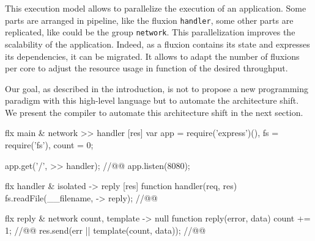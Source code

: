 This execution model allows to parallelize the execution of an application.
Some parts are arranged in pipeline, like the fluxion \texttt{handler}, some other parts are replicated, like could be the group \texttt{network}.
This parallelization improves the scalability of the application.
Indeed, as a fluxion contains its state and expresses its dependencies, it can be migrated.
It allows to adapt the number of fluxions per core to adjust the resource usage in function of the desired throughput.



Our goal, as described in the introduction, is not to propose a new programming paradigm with this high-level language but to automate the architecture shift.
We present the compiler to automate this architecture shift in the next section.

\begin{code}[flx, caption={Example application expressed in the high-level fluxional language},label={lst:fluxional}]
flx main & network
>> handler [res]
  var app = require('express')(),
      fs = require('fs'),
      count = 0;

  app.get('/', >> handler); //@\label{lst:fluxional-streamtohandler}@
  app.listen(8080);

flx handler & isolated
-> reply [res]
  function handler(req, res) {
    fs.readFile(__filename, -> reply); //@\label{lst:fluxional-readfile}@
  }

flx reply & network {count, template}
-> null
  function reply(error, data) {
    count += 1; //@\label{lst:fluxional-counter}@
    res.send(err || template(count, data)); //@\label{lst:fluxional-ressend}@
  }
\end{code}